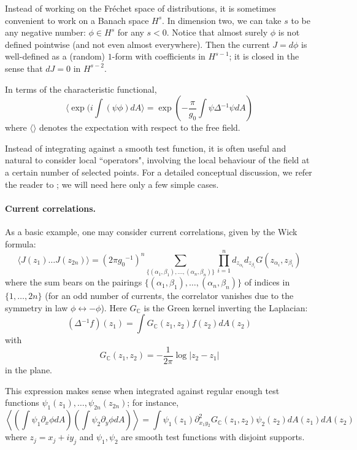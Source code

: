 \documentclass[10pt]{article}
\newcommand{\C}{\mathbb{C}}
\newcommand{\Lap}{\Delta\!}
\begin{document}
Instead of working on the Fr\'echet space of distributions, it is sometimes convenient to work on a Banach space $H^s$. In dimension two, we can take $s$ to be any negative number: $\phi\in H^{s}$ for any $s<0$. Notice that almost surely $\phi$ is not defined pointwise (and not even almost everywhere). Then the current $J=d\phi$ is well-defined as a (random) $1$-form with coefficients in $H^{s-1}$; it is closed in the sense that $dJ=0$ in $H^{s-2}$. 

In terms of the characteristic functional,
\begin{equation}\label{eq:GFFchar}
\langle\exp(i\int(\psi\phi)dA\rangle=\exp(-\frac \pi {g_0}\int \psi\Lap^{-1}\psi dA)
\end{equation}
where $\langle\rangle$ denotes the expectation with respect to the free field. 

Instead of integrating against a smooth test function, it is often useful and natural to consider local ``operators", involving the local behaviour of the field at a certain number of selected points. For a detailed conceptual discussion, we refer the reader to \cite{MakKan_GFFCFT}; we will need here only a few simple cases.

\paragraph{Current correlations.\\}
As a basic example, one may consider current correlations, given by the Wick formula:
$$\langle J(z_1)\dots J({z_{2n}})\rangle =(2\pi {g_0}^{-1})^n\sum_{\{(\alpha_1,\beta_1),\dots,(\alpha_n,\beta_n)\}}\prod_{i=1}^n d_{z_{\alpha_i}}d_{z_{\beta_i}}G(z_{\alpha_i},z_{\beta_i})$$
where the sum bears on the pairings $\{(\alpha_1,\beta_1),\dots,(\alpha_n,\beta_n)\}$ of indices in $\{1,\dots,2n\}$ (for an odd number of currents, the correlator vanishes due to the symmetry in law $\phi\leftrightarrow-\phi$). Here $G_\C$ is the Green kernel inverting the Laplacian:
$$(\Lap^{-1} f)(z_1)=\int G_\C(z_1,z_2)f(z_2)dA(z_2)$$
with 
$$G_\C(z_1,z_2)=-\frac{1}{2\pi}\log|z_2-z_1|$$
in the plane. 

This expression makes sense when integrated against regular enough test functions $\psi_1(z_1),\dots,\psi_{2n}(z_{2n})$; for instance,
$$\left\langle\left(\int\psi_1\partial_{x}\phi dA\right)\left(\int\psi_2\partial_{y}\phi dA\right)\right\rangle=\int\psi_1(z_1)\partial^2_{x_1y_2}G_\C(z_1,z_2)\psi_2(z_2)dA(z_1)dA(z_2)$$
where $z_j=x_j+iy_j$ and $\psi_1,\psi_2$ are smooth test functions with disjoint supports.
\end{document}
